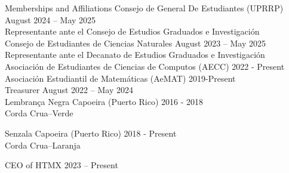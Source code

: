 \documentclass{resume} %
\begin{document}
\begin{rSection}{Memberships and Affiliations}
    Consejo de General De Estudiantes (UPRRP) \hfill{August 2024 -- May 2025} \\
    \hspace*{17mm} Representante ante el Consejo de Estudios
    Graduados e Investigaci\'on \\

    Consejo de Estudiantes de Ciencias Naturales \hfill{August 2023 -- May 2025} \\
    \hspace*{17mm} Representante ante el Decanato de Estudios
    Graduados e Investigaci\'on \\

    Asociaci\'on de Estudiantes de Ciencias de Computos (AECC) \hfill{2022 - Present} \\

    Asociaci\'on Estudiantil de Matem\'aticas (AeMAT) \hfill{2019-Present} \\

    \hspace*{17mm} Treasurer \hfill{August 2022 -- May 2024}   \\


    Lembran\c{c}a Negra Capoeira (Puerto Rico) \hfill{2016 - 2018} \\
    \hspace*{17mm} Corda Crua--Verde

    Senzala Capoeira (Puerto Rico) \hfill{2018 - Present} \\
    \hspace*{17mm} Corda Crua--Laranja

    CEO of HTMX \hfill{2023 -- Present} \\
\end{rSection}
\end{document}
